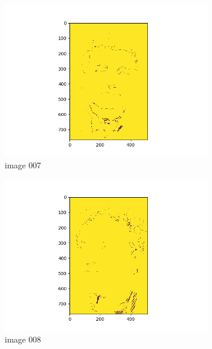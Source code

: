 \documentclass[11pt]{report}
\begin{document}
\begin{figure}[H]
\begin{subfigure}{0.3\textwidth}
        \includegraphics[width=\textwidth]{Task 2 Plots/skin_color_mask_007.png}
        \caption{image 007}
        \label{fig:skin_colormask7}
    \end{subfigure}
    \begin{subfigure}{0.3\textwidth}
        \centering
        \includegraphics[width=\textwidth]{Task 2 Plots/skin_color_mask_008.png}
        \caption{image 008}
        \label{fig:skin_colormask8}
    \end{subfigure}
    \begin{subfigure}{0.3\textwidth}
        \centering

\end{subfigure}
\end{figure}
\end{document}
